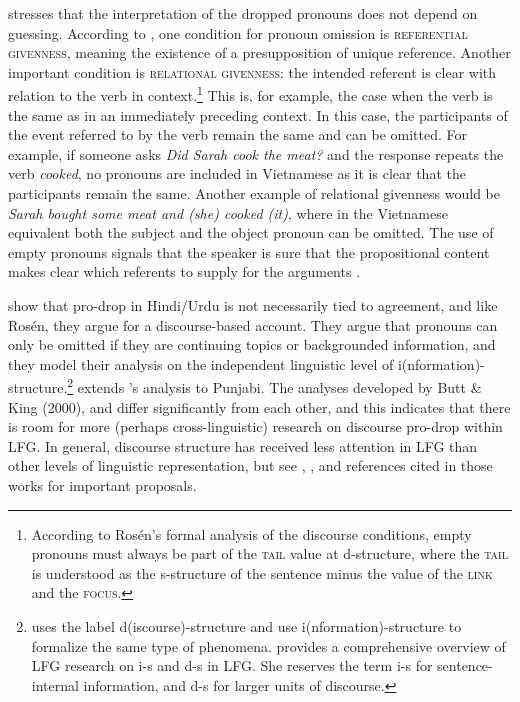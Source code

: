 \documentclass[output=paper,hidelinks]{langscibook}
\begin{document}
 \citet{rosen1998}  stresses that the interpretation of the dropped pronouns does not depend on guessing.    According to   \citet[Chapter~7]{rosen1998},    one condition for pronoun omission is  \textsc{referential givenness}, meaning the existence of a presupposition of unique reference.  Another important condition is  \textsc{relational givenness:}  the intended referent is clear with relation to the verb in context.\footnote{According to  Ros\'{e}n's formal analysis of the discourse conditions,  empty pronouns must always be part of the \textsc{tail} value at d-structure, where the \textsc{tail} is understood as the s-structure of the sentence minus the value of the \textsc{link} and the \textsc{focus}.}  This is, for example, the case when the verb is the same as in an immediately preceding context.  In this case, the  participants of the event referred to  by the verb remain the same and can be omitted. For example, if someone asks  \textit{Did Sarah cook the meat?} and the response repeats the verb \textit{cooked}, no pronouns are included in Vietnamese as it is clear that the participants remain the same. Another example of relational givenness would be \textit{Sarah bought some meat and (she) cooked (it)}, where in the Vietnamese equivalent      both the subject and the object pronoun can be omitted. The use of empty pronouns signals that the speaker is sure that the propositional content makes clear which referents to supply for the  arguments  \citep[137]{rosen1998}.


\citet{BK00} show that pro-drop in  Hindi/Urdu is not necessarily tied to agreement, and like Ros\'{e}n, they argue for a discourse-based account. They argue that pronouns can only be omitted if they are  continuing topics or backgrounded information, and they model their analysis on the independent linguistic level of i(nformation)-structure.\footnote{\citet{rosen1998} uses the label d(iscourse)-structure   and \citet{BK00} use i(nformation)-structure to  formalize the same type of phenomena.   provides a comprehensive overview of LFG research on i-s and d-s in LFG. She reserves the term i-s for sentence-internal information, and d-s for larger units of discourse.} \citet{butt07} extends   \citeauthor{BK00}'s analysis to   Punjabi.   The analyses developed by   Butt \& King (2000),  \citet{LukeBodomoNancarrow2001}  and  \citet{rosen1998}  differ significantly from each other, and  this indicates that  there is room for more (perhaps cross-linguistic)  research on discourse pro-drop within LFG.   In general,    discourse structure   has received less attention in LFG than other levels of linguistic representation, but see       \citet{kingzaenen}, \citet{DalrympleAl17}, and references cited in those works for important proposals.
\end{document}
